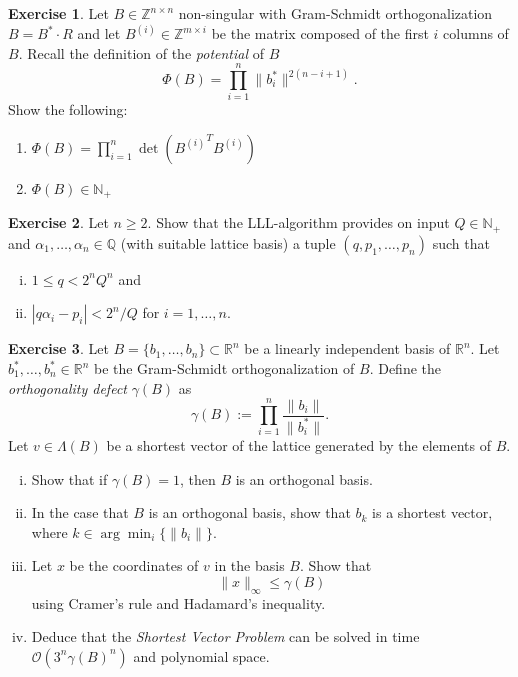 \documentclass[12pt,a4paper]{article}
\theoremstyle{plain}
\newtheorem*{Sol*}{Solution}
\theoremstyle{definition}
\newtheorem{Ex}{Exercise}
\def \R {\mathbb R}
\newif\ifsolutions
\newcommand{\exercise}[2]{
			\begin{Ex} #1 \end{Ex}
			\ifsolutions  \begin{Sol*} #2 \end{Sol*} \bigskip \else \bigskip  \fi
		}
\begin{document}
  \exercise{
    Let $B ∈ℤ^{n×n}$ non-singular with Gram-Schmidt orthogonalization $B = B^*⋅ R$ and let $B^{(i)} ∈ℤ^{m ×i}$ be the matrix composed of the first $i$ columns of $B$.  Recall the definition of the \emph{potential} of $B$
    \begin{displaymath}
      Φ(B) = ∏_{i=1}^n \|b_i^*\|^{2(n-i+1)}.
    \end{displaymath}
    Show the following:
    \begin{enumerate}
    \item $ Φ(B) = ∏_{i=1}^n \det\left({B^{(i)}}^T B^{(i)}\right)$
    \item $ Φ(B) ∈ ℕ_+$  
    \end{enumerate}
  }{}


  \exercise{Let $n≥2$. 
    Show that the LLL-algorithm provides on input $Q ∈ℕ_+$ and $α_1,\dots,α_n ∈ℚ$ (with suitable lattice basis)  a tuple $(q,p_1,\dots,p_n)$ such that
      \begin{enumerate}[i)] 
      \item $1 ≤ q < 2^n Q^n$ and
      \item $| q α_i - p_i | < 2^n/Q$ for $i=1,\dots,n$. 
      \end{enumerate}

    }{}
  
\exercise{
	Let $B = \{b_1,\dots,b_n\} \subset \R^n$ be a linearly independent basis of $\R^n$. 
	Let $b_1^*,\dots,b_n^* ∈ ℝ^n$ be the Gram-Schmidt orthogonalization of $B$.
	Define the \emph{orthogonality defect} $\gamma(B)$ as
		\[ \gamma(B) := \prod_{i=1}^n \frac{\| b_i \|}{\| b_i^* \|}. \]
	Let $v \in \Lambda(B)$ be a shortest vector of the lattice generated by the elements of $B$.
	\begin{enumerate}[i)]
		\item Show that if $\gamma(B)=1$, then $B$ is an orthogonal basis.
		\item In the case that  $B$ is an orthogonal basis, show that $b_k$ is a shortest vector, where $k \in \arg\min_i \{ \| b_i \| \}$.
		\item Let $x$ be the coordinates of $v$ in the basis $B$. Show that
			\[ \| x \|_\infty \leq \gamma(B) \]
		using Cramer's rule and Hadamard's inequality.
		\item Deduce that the \emph{Shortest Vector Problem} can be solved in time $\mathcal{O}\left(3^n\gamma(B)^n\right)$ and polynomial space.
		
	\end{enumerate}
}
{}
\end{document}
